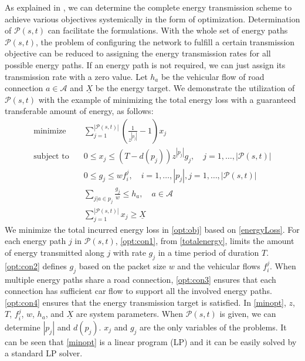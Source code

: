 \documentclass[journal]{IEEEtran}
\begin{document}
As explained in \cite{VEN}, we can determine the complete energy transmission scheme to achieve various objectives systemically in the form of optimization. Determination of  $\mathcal{P}(s,t)$ can facilitate the formulations. 
With the whole set of energy paths $\mathcal{P}(s,t)$, the problem of configuring the network to fulfill a certain transmission objective can be reduced to assigning the energy transmission rates for all possible energy paths. If an energy path is not required, we can just assign its transmission rate with a zero value. 
Let $h_a$ be the vehicular flow of road connection $a\in \mathcal{A}$ and $\underline{X}$ be the energy target.  We demonstrate the utilization of $\mathcal{P}(s,t)$ with the example of minimizing the total energy loss with a  guaranteed transferable amount of energy, as follows: 
\begin{subequations}
\label{minopt}
\begin{align}
\text{minimize}\quad 	& \sum_{j=1}^{|\mathcal{P}(s,t)|}{(\frac{1}{z^{|p_j|}}-1)   x_j} \label{opt:obj}\\
\text{subject to}\quad 
& 0\leq x_j\leq (T-d(p_j))z^{|p_j|}g_j, \quad j=1,\ldots, |\mathcal{P}(s,t)| \label{opt:con1}\\
& 0\leq g_j \leq w f_i^j, \quad i=1,\ldots,|p_j|, j=1,\ldots, |\mathcal{P}(s,t)| \label{opt:con2}\\
& \sum_{j|a\in p_j} \frac{g_j}{w} \leq h_a, \quad a\in \mathcal{A} \label{opt:con3}\\
& \sum_{j=1}^{|\mathcal{P}(s,t)|}{x_j} \geq \underline{X} \label{opt:con4}
\end{align}
\end{subequations}
We minimize the total incurred energy loss in \eqref{opt:obj} based on \eqref{energyLoss}. For each energy path $j$ in $\mathcal{P}(s,t)$, \eqref{opt:con1}, from \eqref{totalenergy}, limits the amount of energy transmitted along  $j$ with rate $g_j$ in a time period of duration $T$. \eqref{opt:con2} defines $g_j$ based on the packet size $w$ and the vehicular flows $f_i^j$. When multiple energy paths share a road connection, \eqref{opt:con3} ensures that each connection has sufficient car flow to support all the involved energy paths. \eqref{opt:con4} ensures that the energy transmission target is satisfied. In \eqref{minopt}, $z$, $T$, $f_i^j$, $w$, $h_a$, and $\underline{X}$ are system parameters. When $\mathcal{P}(s,t)$ is given, we can determine $|p_j|$ and $d(p_j)$. $x_j$ and $g_j$ are the only variables of the problems. It can be seen that \eqref{minopt} is a linear program (LP) and it can be easily solved by a standard LP solver.
\end{document}

